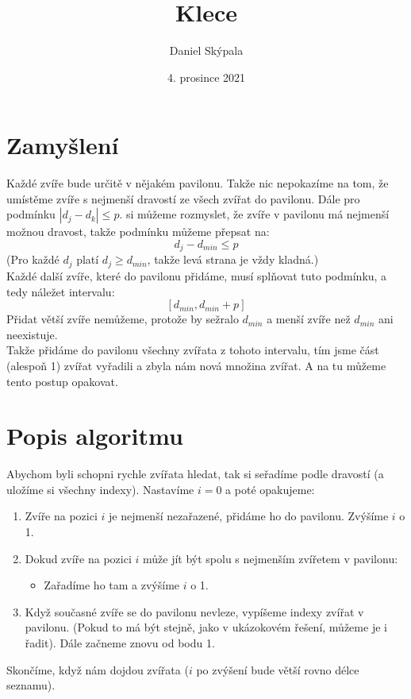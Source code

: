 \documentclass{article}
\title{Klece}
\author{Daniel Skýpala}
\date{4. prosince 2021}
\begin{document}
\maketitle

\section{Zamyšlení}
Každé zvíře bude určitě v nějakém pavilonu. Takže nic nepokazíme na tom, že umístěme zvíře s nejmenší dravostí ze všech zvířat do pavilonu.
Dále pro podmínku \(|d_j − d_k| \leq p.\) si můžeme rozmyslet, že zvíře v pavilonu má nejmenší možnou dravost,
takže podmínku můžeme přepsat na:
\[d_j - d_{min} \leq p\]
(Pro každé \(d_j\) platí \(d_j \geq d_{min}\), takže levá strana je vždy kladná.) \\
Každé další zvíře, které do pavilonu přidáme, musí splňovat tuto podmínku, a tedy náležet intervalu:
\[[d_{min}, d_{min}+p]\]
Přidat větší zvíře nemůžeme, protože by sežralo \(d_{min}\) a menší zvíře než \(d_{min}\) ani neexistuje. \\
Takže přidáme do pavilonu všechny zvířata z tohoto intervalu, tím jsme část (alespoň 1) zvířat vyřadili a zbyla nám nová množina zvířat.
A na tu můžeme tento postup opakovat.

\section{Popis algoritmu}
Abychom byli schopni rychle zvířata hledat, tak si seřadíme podle dravostí (a uložíme si všechny indexy). Nastavíme \(i=0\) a poté opakujeme:
\begin{enumerate}
    \item Zvíře na pozici \(i\) je nejmenší nezařazené, přidáme ho do pavilonu. Zvýšíme \(i\) o 1.
    \item Dokud zvíře na pozici \(i\) může jít být spolu s nejmenším zvířetem v pavilonu:
        \begin{itemize}
            \item Zařadíme ho tam a zvýšíme \(i\) o 1.
        \end{itemize}
    \item Když současné zvíře se do pavilonu nevleze, vypíšeme indexy zvířat v pavilonu. (Pokud to má být stejně, jako v ukázokovém řešení, můžeme
    je i řadit). Dále začneme znovu od bodu 1.
\end{enumerate}
Skončíme, když nám dojdou zvířata (\(i\) po zvýšení bude větší rovno délce seznamu).
\end{document}
